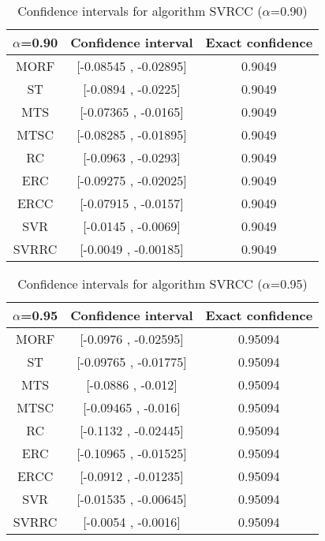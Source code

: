 \documentclass[a4paper,10pt]{article}
\begin{document}
\begin{table}[!htp]
\centering\small
\begin{tabular}{
|c|c|c|}
\hline
 $\alpha$=0.90 & Confidence interval & Exact confidence \\ \hline 
MORF & [-0.08545 , -0.02895] & 0.9049\\ \hline 
ST & [-0.0894 , -0.0225] & 0.9049\\ \hline 
MTS & [-0.07365 , -0.0165] & 0.9049\\ \hline 
MTSC & [-0.08285 , -0.01895] & 0.9049\\ \hline 
RC & [-0.0963 , -0.0293] & 0.9049\\ \hline 
ERC & [-0.09275 , -0.02025] & 0.9049\\ \hline 
ERCC & [-0.07915 , -0.0157] & 0.9049\\ \hline 
SVR & [-0.0145 , -0.0069] & 0.9049\\ \hline 
SVRRC & [-0.0049 , -0.00185] & 0.9049\\ \hline 

\end{tabular}
\caption{Confidence intervals for algorithm SVRCC ($\alpha$=0.90)}
\end{table}
\begin{table}[!htp]
\centering\small
\begin{tabular}{
|c|c|c|}
\hline
 $\alpha$=0.95 & Confidence interval & Exact confidence \\ \hline 
MORF & [-0.0976 , -0.02595] & 0.95094\\ \hline 
ST & [-0.09765 , -0.01775] & 0.95094\\ \hline 
MTS & [-0.0886 , -0.012] & 0.95094\\ \hline 
MTSC & [-0.09465 , -0.016] & 0.95094\\ \hline 
RC & [-0.1132 , -0.02445] & 0.95094\\ \hline 
ERC & [-0.10965 , -0.01525] & 0.95094\\ \hline 
ERCC & [-0.0912 , -0.01235] & 0.95094\\ \hline 
SVR & [-0.01535 , -0.00645] & 0.95094\\ \hline 
SVRRC & [-0.0054 , -0.0016] & 0.95094\\ \hline 

\end{tabular}
\caption{Confidence intervals for algorithm SVRCC ($\alpha$=0.95)}
\end{table}

 \clearpage 
\end{document}
